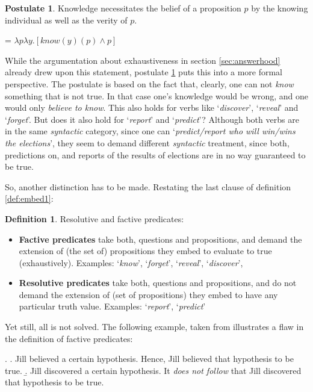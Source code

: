 \documentclass[a4paper]{article}
\newcommand{\term}[1]{\textsf{\textbf{#1}}} %
\newcommand{\example}[1]{`\textit{#1}'} %
\theoremstyle{remark}
\theoremstyle{remark}
\theoremstyle{definition}
\newtheorem{definition}[thm]{Definition}
\theoremstyle{definition}
\newtheorem{postulate}[thm]{Postulate}
\begin{document}
\begin{postulate}\label{def:know}
  Knowledge necessitates the belief of a proposition $p$ by the knowing
  individual as well as the verity of $p$.

   = $\lambda p\lambda y.[know(y)(p)\wedge p]$
\end{postulate}

While the argumentation about exhaustiveness in section \ref{sec:answerhood}
already drew upon this statement, postulate \ref{def:know} puts this into a
more formal perspective. The postulate is based on the fact that, clearly, one
can not \emph{know} something that is not true. In that case one's knowledge
would be wrong, and one would only \emph{believe to know}. This also holds for
verbs like \example{discover}, \example{reveal} and \example{forget}. But does
it also hold for \example{report} and \example{predict}? Although both verbs are
in the same \emph{syntactic} category, since one can \example{predict/report who will
win/wins the elections}, they seem to demand different \emph{syntactic}
treatment, since both, predictions on, and reports of the results of elections are
in no way guaranteed to be true.

So, another distinction has to be made. Restating the last clause of definition
\ref{def:embed1}:

\begin{definition}\label{def:embed2}
  Resolutive and factive predicates:
  \begin{itemize}
  \item \term{Factive predicates} take both, questions and propositions, and
  demand the extension of (the set of) propositions they embed to evaluate to true (exhaustively).
  Examples:
  \example{know}, \example{forget}, \example{reveal}, \example{discover},
  \item \term{Resolutive predicates} take both, questions and propositions, and
  do not demand the extension of (set of propositions) they embed to have any particular truth value.
  Examples:
  \example{report}, \example{predict}
  \end{itemize}
\end{definition}

Yet still, all is not solved. The following example, taken from \cite[example
(27)]{ginzburg} illustrates a flaw in the definition of factive predicates:

\ex. \label{ex:ginzburg}
\a. Jill believed a certain hypothesis. Hence, Jill believed that hypothesis
to be true.
\b. Jill discovered a certain hypothesis. It \emph{does not follow} that Jill
discovered that hypothesis to be true. 
\end{document}
